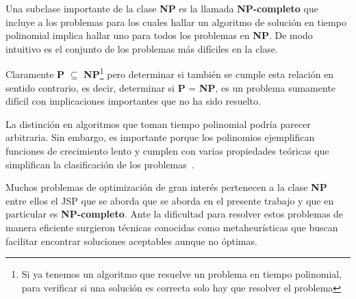 Una subclase importante de la clase \textbf{NP} es la llamada \textbf{NP-completo} que incluye a los problemas para los cuales hallar un algoritmo de solución 
en tiempo polinomial implica hallar uno para todos los problemas en \textbf{NP}. 
%
De modo intuitivo es el conjunto de los problemas más difíciles en la clase.

Claramente \textbf{P} $\subseteq$ \textbf{NP}\footnote{Si ya tenemos un algoritmo que resuelve un problema en tiempo polinomial, para verificar si una solución es correcta 
solo hay que resolver el problema} pero determinar si también se cumple esta relación en sentido contrario, es decir, determinar si \textbf{P} = \textbf{NP}, es un problema 
sumamente difícil con implicaciones importantes que no ha sido resuelto.

La distinción en algoritmos que toman tiempo polinomial podría parecer arbitraria.
%
Sin embargo, es importante porque los polinomios ejemplifican funciones de crecimiento lento y cumplen con varias propiedades teóricas que simplifican la clasificación 
de los problemas~\cite{wigderson2006p}.


Muchos problemas de optimización de gran interés pertenecen a la clase \textbf{NP} entre ellos el JSP que se aborda que se aborda en el presente trabajo y que en 
particular es \textbf{NP-completo}. 
%
Ante la dificultad para resolver estos problemas de manera eficiente surgieron técnicas conocidas como metaheurísticas que buscan facilitar encontrar soluciones aceptables aunque no óptimas.


